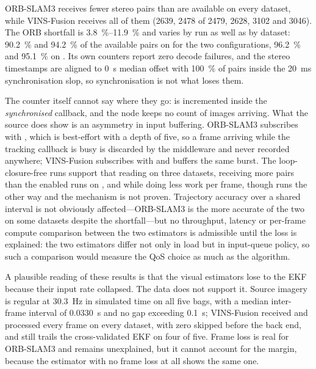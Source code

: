 \begin{queried}[Queried]
ORB-SLAM3 receives fewer stereo pairs than are available on every dataset, while
VINS-Fusion receives all of them (2639, 2478 of 2479, 2628, 3102 and 3046). The
ORB shortfall is \SIrange{3.8}{11.9}{\percent} and varies by run as well as by
dataset: \SI{90.2}{\percent} and \SI{94.2}{\percent} of the available pairs on
 for the two configurations, \SI{96.2}{\percent} and
\SI{95.1}{\percent} on . Its own counters report zero decode
failures, and the stereo timestamps are aligned to \SI{0}{\second} median offset
with \SI{100}{\percent} of pairs inside the \SI{20}{\milli\second} synchronisation
slop, so synchronisation is not what loses them.

The counter itself cannot say where they go:  is
incremented inside the \emph{synchronised} callback, and the node keeps no count of
images arriving. What the source does show is an asymmetry in input buffering.
ORB-SLAM3 subscribes with , which is best-effort with
a depth of five, so a frame arriving while the tracking callback is busy is
discarded by the middleware and never recorded anywhere; VINS-Fusion subscribes
with  and buffers the same burst.  The loop-closure-free runs support that
reading on three datasets, receiving more pairs than the enabled runs on
,  and  while doing less work per frame,
though  runs the other way and the mechanism is not proven.
Trajectory accuracy over a shared interval is not obviously affected---ORB-SLAM3
is the more accurate of the two on some datasets despite the shortfall---but no
throughput, latency or per-frame compute comparison between the two estimators is
admissible until the loss is explained: the two estimators differ not only in
load but in input-queue policy, so such a comparison would measure the QoS choice
as much as the algorithm.
\end{queried}

\begin{queried}
A plausible reading of these results is that the visual estimators lose to the EKF
because their input rate collapsed. The data does not support it. Source imagery
is regular at \SI{30.3}{\hertz} in simulated time on all five bags, with a median
inter-frame interval of \SI{0.0330}{\second} and no gap exceeding
\SI{0.1}{\second}; VINS-Fusion received and processed every frame on every
dataset, with zero skipped before the back end, and still trails the
cross-validated EKF on four of five. Frame loss is real for ORB-SLAM3 and remains
unexplained, but it cannot account for the margin, because the estimator with no
frame loss at all shows the same one.
\end{queried}

